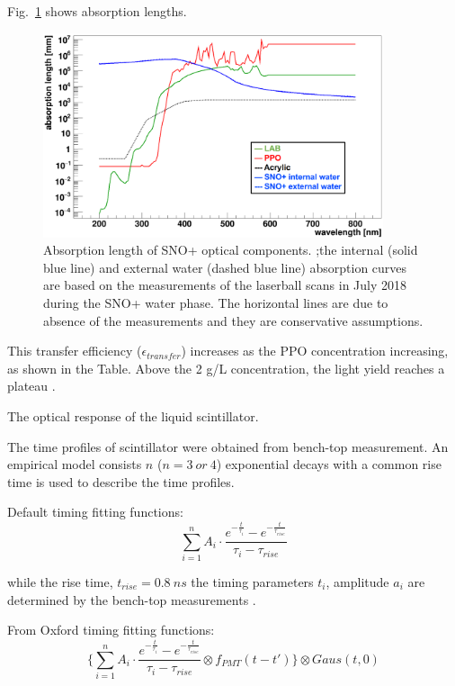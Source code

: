 Fig.~\ref{absLength} shows absorption lengths.

\begin{figure}[!htb]
	\centering
	\includegraphics[width=10cm]{absLength.png}
	\caption{Absorption length of SNO+ optical components. ;the internal (solid blue line) and external water (dashed blue line) absorption curves are based on the measurements of the laserball scans in July 2018 during the SNO+ water phase. The horizontal lines are due to absence of the measurements and they are conservative assumptions.}
	\label{absLength}
\end{figure}


This transfer efficiency ($\mathcal{\epsilon}_{transfer}$) increases as the PPO concentration increasing, as shown in the Table. Above the 2 g/L concentration, the light yield reaches a plateau
\cite{collaboration2020development}.


The optical response of the liquid scintillator.

The time profiles of scintillator were obtained from bench-top measurement. 
An empirical model consists $n$ ($n=3~or~4$) exponential decays  with a common rise time is used to describe the time profiles\cite{biller2020slow}.

Default timing fitting functions:
\[\sum^{n}_{i=1}A_i\cdot\frac{e^{-\frac{t}{\tau_i}}-e^{-\frac{t}{\tau_{rise}}}}{\tau_i-\tau_{rise}}
\]

while the rise time, $t_{rise} = 0.8~ns$ the timing parameters $t_i$,
amplitude $a_i$ are determined by the bench-top measurements \cite{chicagoTiming}.


From Oxford timing fitting functions: 
\[
\{\sum^{n}_{i=1}A_i\cdot\frac{e^{-\frac{t}{\tau_i}}-e^{-\frac{t}{\tau_{rise}}}}{\tau_i-\tau_{rise}}\otimes f_{PMT}(t-t')\}\otimes Gaus(t,0)
\]

